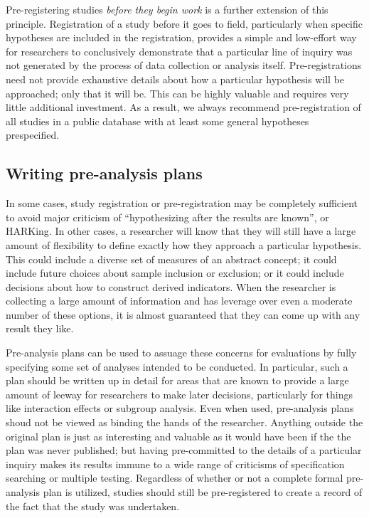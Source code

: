 Pre-registering studies \textit{before they begin work} is a further extension of this principle.\cite{nosek2018preregistration}
Registration of a study before it goes to field,
particularly when specific hypotheses are included in the registration,
provides a simple and low-effort way for researchers
to conclusively demonstrate that a particular line of inquiry
was not generated by the process of data collection or analysis itself.
Pre-registrations need not provide exhaustive details about how
a particular hypothesis will be approached; only that it will be.
This can be highly valuable and requires very little additional investment.
As a result, we always recommend pre-registration of all studies
in a public database with at least some general hypotheses prespecified.

\subsection{Writing pre-analysis plans}

In some cases, study registration or pre-registration
may be completely sufficient to avoid major criticism of
``hypothesizing after the results are known'', or HARKing.\cite{kerr1998harking}
In other cases, a researcher will know that they will still have
a large amount of flexibility to define exactly how they approach a particular hypothesis.
This could include a diverse set of measures of an abstract concept;
it could include future choices about sample inclusion or exclusion;
or it could include decisions about how to construct derived indicators.
When the researcher is collecting a large amount of information
and has leverage over even a moderate number of these options,
it is almost guaranteed that they can come up with any result they like.\cite{gelman2013garden}

Pre-analysis plans can be used to assuage these concerns for evaluations
by fully specifying some set of analyses intended to be conducted.
In particular, such a plan should be written up in detail
for areas that are known to provide a large amount of leeway
for researchers to make later decisions,
particularly for things like interaction effects or subgroup analysis.
Even when used, pre-analysis plans shoud not be viewed as binding the hands of the researcher.\cite{olken2015promises}
Anything outside the original plan is just as interesting and valuable
as it would have been if the the plan was never published;
but having pre-committed to the details of a particular inquiry makes its results
immune to a wide range of criticisms of specification searching or multiple testing.\cite{duflo2020praise}
Regardless of whether or not a complete formal pre-analysis plan is utilized,
studies should still be pre-registered
to create a record of the fact that the study was undertaken.

